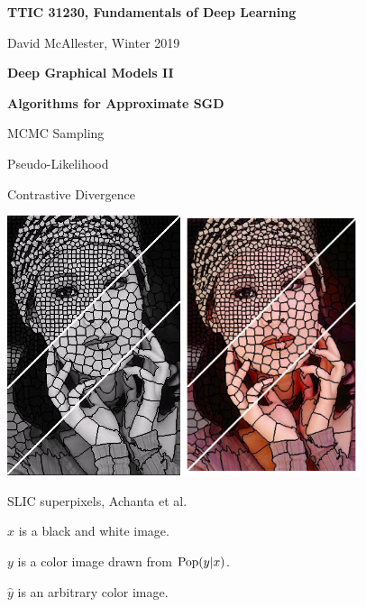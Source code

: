 





{\Huge

  \centerline{\bf TTIC 31230, Fundamentals of Deep Learning}
  \bigskip
  \centerline{David McAllester, Winter 2019}
  \vfill
  \centerline{\bf Deep Graphical Models II}
  \vfill
  \centerline{\bf Algorithms for Approximate SGD}
  \vfill
  \centerline{MCMC Sampling}
  \vfill
  \centerline{Pseudo-Likelihood}
  \vfill
  \centerline{Contrastive Divergence}
\vfill


\centerline{\includegraphics[height = 3in]{../images/SLIC} \hspace{.5in} \includegraphics[height = 3in]{../images/SLICcolor}}
\centerline{\huge SLIC superpixels, Achanta et al.}

$x$ is a black and white image.

\vfill
$y$ is a color image drawn from $\mathrm{Pop}(y|x)$.

\vfill
$\hat{y}$ is an arbitrary color image.

}
